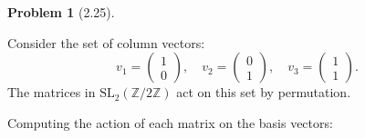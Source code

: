\documentclass[12pt]{article}
\theoremstyle{definition}
\newtheorem{problem}{Problem}
\begin{document}
\begin{problem}[2.25]
\begin{enumerate}[label=(\alph*)]
        \begin{solution}
            Consider the set of column vectors:
            \[
            v_1 = \begin{pmatrix} 1 \\ 0 \end{pmatrix}, \quad
            v_2 = \begin{pmatrix} 0 \\ 1 \end{pmatrix}, \quad
            v_3 = \begin{pmatrix} 1 \\ 1 \end{pmatrix}.
            \]
            The matrices in $\text{SL}_2(\mathbb{Z}/2\mathbb{Z})$ act on this set by permutation.
    
            Computing the action of each matrix on the basis vectors:
            

\end{solution}
\end{enumerate}
\end{problem}
\end{document}
